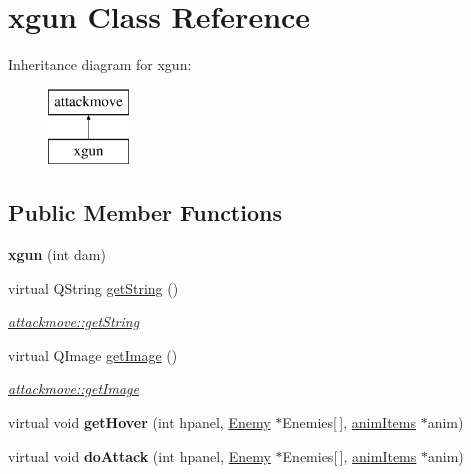 \hypertarget{classxgun}{\section{xgun Class Reference}
\label{classxgun}
}
Inheritance diagram for xgun\-:\begin{figure}[H]
\begin{center}
\leavevmode
\includegraphics[height=2.000000cm]{classxgun}
\end{center}
\end{figure}
\subsection*{Public Member Functions}
\begin{DoxyCompactItemize}
\item 
\hypertarget{classxgun_a559665713dc1ae233184807d8b38ab7f}{{\bfseries xgun} (int dam)}\label{classxgun_a559665713dc1ae233184807d8b38ab7f}

\item 
virtual Q\-String \hyperlink{classxgun_a8d091859d655ff1703630ba7dd88a358}{get\-String} ()
\begin{DoxyCompactList}\small\item\em \hyperlink{classattackmove_ada49eedf4b893372c576edd48fe73161}{attackmove\-::get\-String} \end{DoxyCompactList}\item 
virtual Q\-Image \hyperlink{classxgun_adf5511bd6ed5dfb184a8a3b6b757608a}{get\-Image} ()
\begin{DoxyCompactList}\small\item\em \hyperlink{classattackmove_aca59a2343b7a6c195d300dda5c8d952d}{attackmove\-::get\-Image} \end{DoxyCompactList}\item 
\hypertarget{classxgun_aac799bda61860430dbbd9403b80a1efd}{virtual void {\bfseries get\-Hover} (int hpanel, \hyperlink{class_enemy}{Enemy} $\ast$Enemies\mbox{[}$\,$\mbox{]}, \hyperlink{classanim_items}{anim\-Items} $\ast$anim)}\label{classxgun_aac799bda61860430dbbd9403b80a1efd}

\item 
\hypertarget{classxgun_a8ede91a770bcedc6c4454615d38b5e84}{virtual void {\bfseries do\-Attack} (int hpanel, \hyperlink{class_enemy}{Enemy} $\ast$Enemies\mbox{[}$\,$\mbox{]}, \hyperlink{classanim_items}{anim\-Items} $\ast$anim)}\label{classxgun_a8ede91a770bcedc6c4454615d38b5e84}

\end{DoxyCompactItemize}
